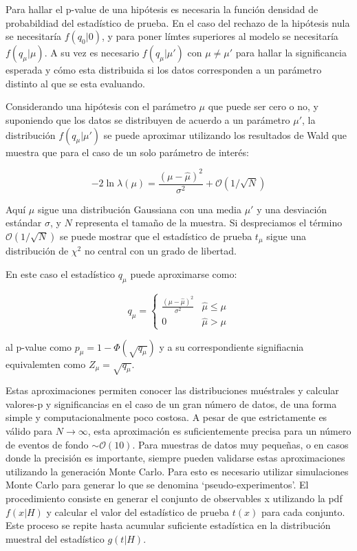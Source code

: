 Para hallar el p-value de una hipótesis es necesaria la función densidad de probabildiad del estadístico de prueba. En el caso del rechazo de la hipótesis nula se necesitaría $f(q_{0}|0)$, y para poner límtes superiores al modelo se necesitaría $f(q_{\mu}|\mu)$. A su vez es necesario $f(q_{\mu}|\mu')$ con $\mu\neq\mu'$ para hallar la significancia esperada y cómo esta distribuida si los datos corresponden a un parámetro distinto al que se esta evaluando. 

Considerando una hipótesis con el parámetro $\mu$ que puede ser cero o no, y suponiendo que los datos se distribuyen de acuerdo a un parámetro $\mu'$, la distribución $f(q_{\mu}|\mu')$ se puede aproximar utilizando los resultados de Wald %
que muestra que para el caso de un solo parámetro de interés:

\begin{equation}
	-2\ln{\lambda(\mu)}=\frac{(\mu-\hat{\mu})^{2}}{\sigma^{2}}+\mathcal{O}(1/\sqrt{N})
\end{equation}

Aquí $\mu$ sigue una distribución Gaussiana con una media $\mu'$ y una desviación estándar $\sigma$, y $N$ representa el tamaño de la muestra. Si despreciamos el término $\mathcal{O}(1/\sqrt{N})$ se puede mostrar que el estadístico de prueba $t_{\mu}$ sigue una distribución de $\chi^{2}$ no central con un grado de libertad.

En este caso el estadístico $q_{\mu}$ puede aproximarse como:

\begin{equation}
	q_{\mu}=
	\begin{cases}
		\frac{(\mu-\hat{\mu})^{2}}{\sigma^{2}} & \hat{\mu}\le\mu\\
		0 & \hat{\mu}>\mu
	\end{cases}
\end{equation}

al p-value como $p_{\mu}=1-\Phi(\sqrt{q_{\mu}})$ y a su correspondiente signifiacnia equivalemten como $Z_{\mu}=\sqrt{q_{\mu}}$.

Estas aproximaciones permiten conocer las distribuciones muéstrales y calcular valores-p y significancias en el caso de un gran número de datos, de una forma simple y computacionalmente poco
costosa. A pesar de que estrictamente es válido para $N\to\infty$, esta aproximación es suficientemente
precisa para un número de eventos de fondo $\sim \mathcal{O}(10)$.
Para muestras de datos muy pequeñas, o en casos donde la precisión es importante, siempre pueden
validarse estas aproximaciones utilizando la generación Monte Carlo. Para esto es necesario utilizar
simulaciones Monte Carlo para generar lo que se denomina `pseudo-experimentos'. El procedimiento
consiste en generar el conjunto de observables x utilizando la pdf $f(x|H)$ y calcular el valor del
estadístico de prueba $t(x)$ para cada conjunto. Este proceso se repite hasta acumular suficiente
estadística en la distribución muestral del estadístico $g(t|H)$.

